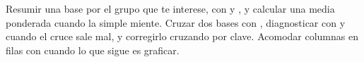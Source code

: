 \yasabemos
  {Resumir una base por el grupo que te interese, con  y
   , y calcular una media ponderada cuando la simple miente.}
  {Cruzar dos bases con , diagnosticar con  y
    cuando el cruce sale mal, y corregirlo cruzando por clave.}
  {Acomodar columnas en filas con  cuando lo que sigue
   es graficar.}



